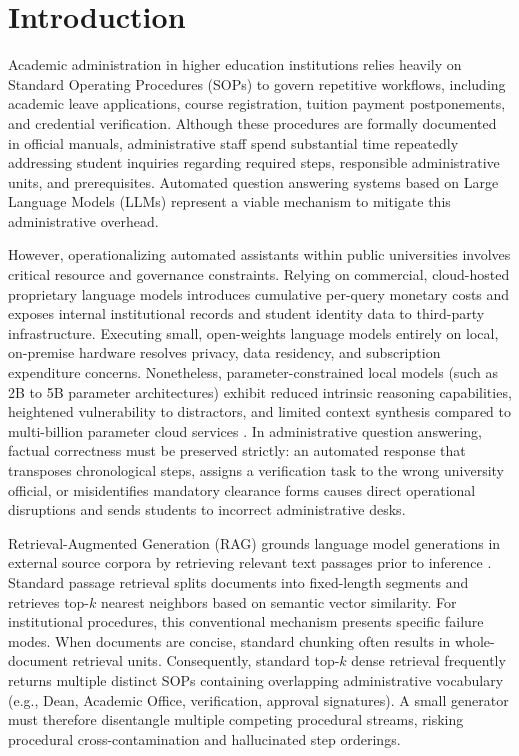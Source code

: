 \documentclass[preprint,10pt]{elsarticle}
\begin{document}
\section{Introduction}
\label{sec:intro}

Academic administration in higher education institutions relies heavily on Standard Operating Procedures (SOPs) to govern repetitive workflows, including academic leave applications, course registration, tuition payment postponements, and credential verification. Although these procedures are formally documented in official manuals, administrative staff spend substantial time repeatedly addressing student inquiries regarding required steps, responsible administrative units, and prerequisites. Automated question answering systems based on Large Language Models (LLMs) represent a viable mechanism to mitigate this administrative overhead.

However, operationalizing automated assistants within public universities involves critical resource and governance constraints. Relying on commercial, cloud-hosted proprietary language models introduces cumulative per-query monetary costs and exposes internal institutional records and student identity data to third-party infrastructure. Executing small, open-weights language models entirely on local, on-premise hardware resolves privacy, data residency, and subscription expenditure concerns. Nonetheless, parameter-constrained local models (such as 2B to 5B parameter architectures) exhibit reduced intrinsic reasoning capabilities, heightened vulnerability to distractors, and limited context synthesis compared to multi-billion parameter cloud services \cite{liu2024lost}. In administrative question answering, factual correctness must be preserved strictly: an automated response that transposes chronological steps, assigns a verification task to the wrong university official, or misidentifies mandatory clearance forms causes direct operational disruptions and sends students to incorrect administrative desks.

Retrieval-Augmented Generation (RAG) grounds language model generations in external source corpora by retrieving relevant text passages prior to inference \cite{lewis2020rag,gao2023ragsurvey}. Standard passage retrieval splits documents into fixed-length segments and retrieves top-$k$ nearest neighbors based on semantic vector similarity. For institutional procedures, this conventional mechanism presents specific failure modes. When documents are concise, standard chunking often results in whole-document retrieval units. Consequently, standard top-$k$ dense retrieval frequently returns multiple distinct SOPs containing overlapping administrative vocabulary (e.g., Dean, Academic Office, verification, approval signatures). A small generator must therefore disentangle multiple competing procedural streams, risking procedural cross-contamination and hallucinated step orderings.
\end{document}

